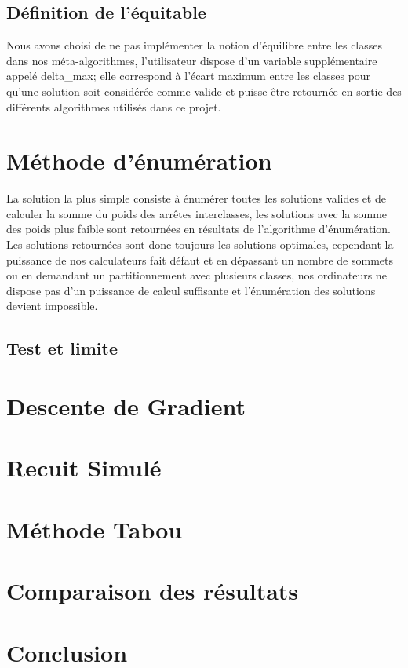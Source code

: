 \documentclass[a4paper]{article}
\begin{document}
\subsection{Définition de l'équitable}

Nous avons choisi de ne pas implémenter la notion  d'équilibre entre les classes dans nos méta-algorithmes, l'utilisateur dispose d'un variable supplémentaire appelé delta\_max; elle correspond à l'écart maximum entre les classes pour qu'une solution soit considérée comme valide et puisse être retournée en sortie des différents algorithmes utilisés dans ce projet.


\section{Méthode d’énumération}
La solution la plus simple consiste à énumérer toutes les solutions valides et de calculer la somme du poids des arrêtes interclasses, les solutions avec la somme des poids plus faible sont retournées en résultats de l'algorithme d'énumération. Les solutions retournées sont donc toujours les solutions optimales, cependant la puissance de nos calculateurs fait défaut et en dépassant un nombre de sommets ou en demandant un partitionnement avec plusieurs classes, nos ordinateurs ne dispose pas d'un puissance de calcul suffisante et l'énumération des solutions devient impossible.

\subsection{Test et limite}

\section{Descente de Gradient}

\section{Recuit Simulé}

\section{Méthode Tabou}

\section{Comparaison des résultats}

\section{Conclusion}
\end{document}
